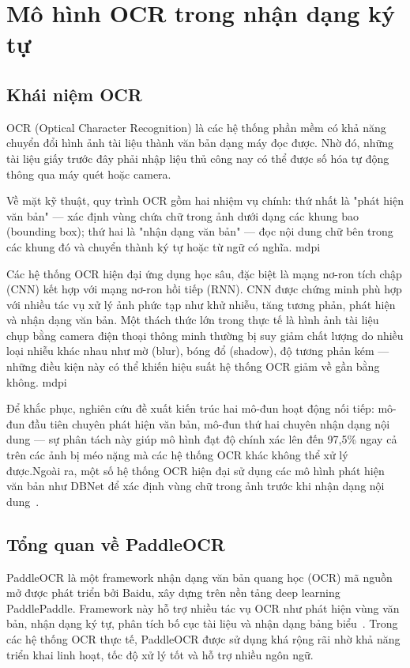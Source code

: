 \documentclass[13pt,a4paper]{report}
\begin{document}

\section{Mô hình OCR trong nhận dạng ký tự}

\subsection{Khái niệm OCR}

OCR (Optical Character Recognition) là các hệ thống phần mềm có khả năng chuyển đổi hình ảnh tài liệu thành văn bản dạng máy đọc được. Nhờ đó, những tài liệu giấy trước đây phải nhập liệu thủ công nay có thể được số hóa tự động thông qua máy quét hoặc camera. 

Về mặt kỹ thuật, quy trình OCR gồm hai nhiệm vụ chính: thứ nhất là "phát hiện văn bản" — xác định vùng chứa chữ trong ảnh dưới dạng các khung bao (bounding box); thứ hai là "nhận dạng văn bản" — đọc nội dung chữ bên trong các khung đó và chuyển thành ký tự hoặc từ ngữ có nghĩa. mdpi

Các hệ thống OCR hiện đại ứng dụng học sâu, đặc biệt là mạng nơ-ron tích chập (CNN) kết hợp với mạng nơ-ron hồi tiếp (RNN). CNN được chứng minh phù hợp với nhiều tác vụ xử lý ảnh phức tạp như khử nhiễu, tăng tương phản, phát hiện và nhận dạng văn bản. 
Một thách thức lớn trong thực tế là hình ảnh tài liệu chụp bằng camera điện thoại thông minh thường bị suy giảm chất lượng do nhiều loại nhiễu khác nhau như mờ (blur), bóng đổ (shadow), độ tương phản kém — những điều kiện này có thể khiến hiệu suất hệ thống OCR giảm về gần bằng không. mdpi

Để khắc phục, nghiên cứu đề xuất kiến trúc hai mô-đun hoạt động nối tiếp: mô-đun đầu tiên chuyên phát hiện văn bản, mô-đun thứ hai chuyên nhận dạng nội dung — sự phân tách này giúp mô hình đạt độ chính xác lên đến 97,5\% ngay cả trên các ảnh bị méo nặng mà các hệ thống OCR khác không thể xử lý được.Ngoài ra, một số hệ thống OCR hiện đại sử dụng các mô hình phát hiện văn bản như DBNet để xác định vùng chữ trong ảnh trước khi nhận dạng nội dung~\cite{liao2019dbnet}.
\subsection{Tổng quan về PaddleOCR}

PaddleOCR là một framework nhận dạng văn bản quang học (OCR) mã nguồn mở được phát triển bởi Baidu, xây dựng trên nền tảng deep learning PaddlePaddle. Framework này hỗ trợ nhiều tác vụ OCR như phát hiện vùng văn bản, nhận dạng ký tự, phân tích bố cục tài liệu và nhận dạng bảng biểu~\cite{paddleocr_docs,paddleocr_github}. Trong các hệ thống OCR thực tế, PaddleOCR được sử dụng khá rộng rãi nhờ khả năng triển khai linh hoạt, tốc độ xử lý tốt và hỗ trợ nhiều ngôn ngữ.
\end{document}
